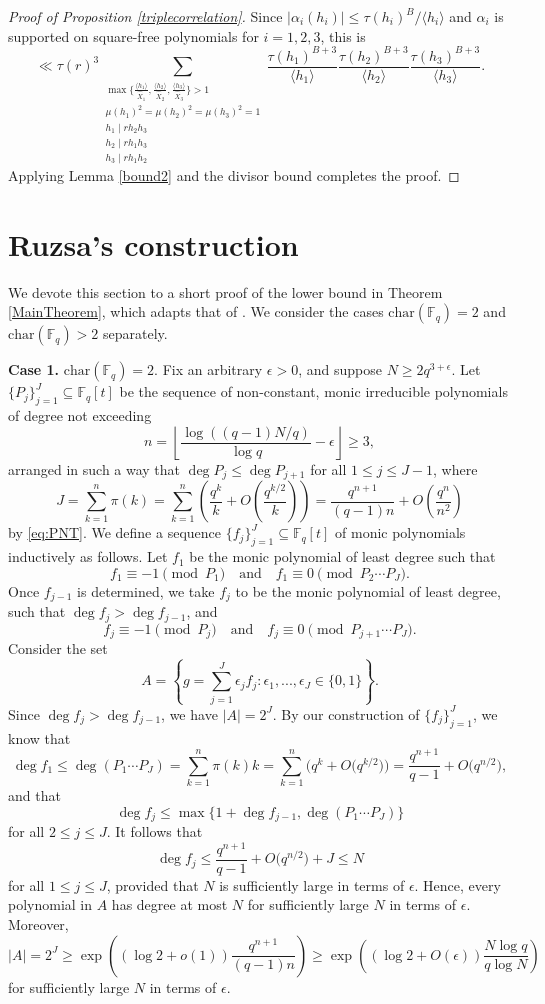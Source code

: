 \documentclass{article}
\theoremstyle{definition}
\theoremstyle{definition}
\theoremstyle{remark}
\newcommand{\F}{\mathbb{F}_q[t]}
\newcommand{\1}{\mathbf{1}}
\numberwithin{equation}{section}
\begin{document}
\begin{proof}[Proof of Proposition \ref{triplecorrelation}]
Since $|\alpha_i(h_i)|\leq\tau(h_i)^B/\langle h_i\rangle $ and $\alpha_i$ is supported on square-free polynomials for $i=1,2,3$, this is 
\[\ll \tau(r)^3\sum_{\substack{\max\big\{\frac{\langle h_1\rangle }{\widehat{X}_1},\frac{\langle h_2\rangle }{\widehat{X}_2},\frac{\langle h_3\rangle }{\widehat{X}_3}\big\}>1\\\mu(h_1)^2=\mu(h_2)^2=\mu(h_3)^2=1\\h_1\mid rh_2h_3\\ h_2\mid rh_1h_3\\h_3\mid rh_1h_2}}\frac{\tau(h_1)^{B+3}}{\langle{h_1}\rangle}\frac{\tau(h_2)^{B+3}}{\langle{h_2}\rangle}\frac{\tau(h_3)^{B+3}}{\langle{h_3}\rangle}.\]
Applying Lemma \ref{bound2} and the divisor bound completes the proof. 
\end{proof}
\section{Ruzsa's construction}
We devote this section to a short proof of the lower bound in Theorem \ref{MainTheorem}, which adapts that of \cite[Theorem 4]{Ruzsa1984}. We consider the cases $\text{char}(\mathbb{F}_q)=2$ and $\text{char}(\mathbb{F}_q)>2$ separately.

\textbf{Case 1.} $\text{char}(\mathbb{F}_q)=2$. Fix an arbitrary $\epsilon>0$, and suppose $N\ge 2q^{3+\epsilon}$. Let $\{P_j\}_{j=1}^{J}\subseteq\F$ be the sequence of non-constant, monic irreducible polynomials of degree not exceeding
\[n=\left\lfloor\frac{\log((q-1)N/q)}{\log q}-\epsilon\right\rfloor\ge3,\] 
arranged in such a way that $\deg P_j\le\deg P_{j+1}$ for all $1\le j\le J-1$, where 
\[J=\sum_{k=1}^n\pi(k)=\sum_{k=1}^n\left(\frac{q^k}{k}+O\left(\frac{q^{k/2}}{k}\right)\right)=\frac{q^{n+1}}{(q-1)n}+O\left(\frac{q^{n}}{n^2}\right)\] 
by \eqref{eq:PNT}. We define a sequence $\{f_j\}_{j=1}^{J}\subseteq\F$ of monic polynomials inductively as follows. Let $f_1$ be the monic polynomial of least degree such that 
\[f_1\equiv -1\pmod{P_1}\quad\text{and}\quad f_1\equiv 0\pmod{P_2\cdots P_J}.\]
Once $f_{j-1}$ is determined, we take $f_{j}$ to be the monic polynomial of least degree, such that $\deg f_{j}>\deg f_{j-1}$, and
\[f_{j}\equiv -1\pmod{P_{j}}\quad\text{and}\quad f_{j}\equiv 0\pmod{P_{j+1}\cdots P_J}.\]
Consider the set 
\[A=\left\{g=\sum_{j=1}^{J}\epsilon_jf_j\colon\epsilon_1,...,\epsilon_J\in\{0,1\}\right\}.\]
Since $\deg f_{j}>\deg f_{j-1}$, we have $|A|=2^J$. By our construction of $\{f_j\}_{j=1}^{J}$, we know that 
\[\deg f_1\le\deg(P_1\cdots P_J)=\sum_{k=1}^n\pi(k)k=\sum_{k=1}^n\big(q^k+O\big(q^{k/2}\big)\big)=\frac{q^{n+1}}{q-1}+O\big(q^{n/2}\big),\]
and that 
\[\deg f_{j}\le \max\{1+\deg f_{j-1},\deg(P_1\cdots P_J)\}\]
for all $2\le j\le J$. It follows that 
\[\deg f_{j}\le\frac{q^{n+1}}{q-1}+O\big(q^{n/2}\big)+J\le N\]
for all $1\le j\le J$, provided that $N$ is sufficiently large in terms of $\epsilon$. Hence, every polynomial in $A$ has degree at most $N$ for sufficiently large $N$ in terms of $\epsilon$. Moreover, 
\[|A|=2^J\ge\exp\left((\log2+o(1))\frac{q^{n+1}}{(q-1)n}\right)\ge\exp\left((\log2+O(\epsilon))\frac{N\log q}{q\log N}\right)\]
for sufficiently large $N$ in terms of $\epsilon$. 
\end{document}
